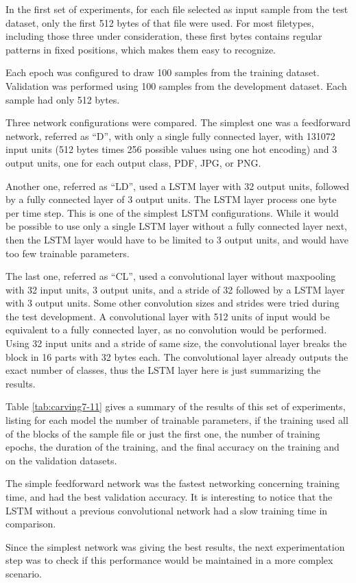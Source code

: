 In the first set of experiments, for each file selected as input sample from the test dataset, only the first 512 bytes of that file were used. For most filetypes, including those three under consideration, these first bytes contains regular patterns in fixed positions, which makes them easy to recognize.

Each epoch was configured to draw 100 samples from the training dataset. Validation was performed using 100 samples from the development dataset. Each sample had only 512 bytes.

Three network configurations were compared. The simplest one was a feedforward network, referred as ``D'', with only a single fully connected layer, with 131072 input units (512 bytes times 256 possible values using one hot encoding) and 3 output units, one for each output class, PDF, JPG, or PNG.

Another one, referred as ``LD'', used a LSTM layer with 32 output units, followed by a fully connected layer of 3 output units. The LSTM layer process one byte per time step. This is one of the simplest LSTM configurations. While it would be possible to use only a single LSTM layer without a fully connected layer next, then the LSTM layer would have to be limited to 3 output units, and would have too few trainable parameters. 

The last one, referred as ``CL'', used a convolutional layer without maxpooling with 32 input units, 3 output units, and a stride of 32 followed by a LSTM layer with 3 output units. Some other convolution sizes and strides were tried during the test development. A convolutional layer with 512 units of input would be equivalent to a fully connected layer, as no convolution would be performed. Using 32 input units and a stride of same size, the convolutional layer breaks the block in 16 parts with 32 bytes each. The convolutional layer already outputs the exact number of classes, thus the LSTM layer here is just summarizing the results.

Table \ref{tab:carving7-11} gives a summary of the results of this set of experiments, listing for each model the number of trainable parameters, if the training used all of the blocks of the sample file or just the first one, the number of training epochs, the duration of the training, and the final accuracy on the training and on the validation datasets.


The simple feedforward network was the fastest networking concerning training time, and had the best validation accuracy. It is interesting to notice that the LSTM without a previous convolutional network had a slow training time in comparison.

Since the simplest network was giving the best results, the next experimentation step was to check if this performance would be maintained in a more complex scenario.

